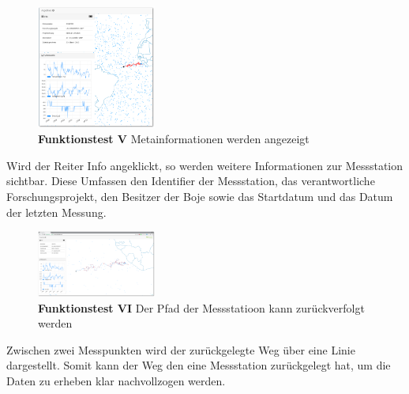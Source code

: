 \begin{figure}
 \centering
 \includegraphics[width=0.35\textwidth]{pix/ftest/003b.png}

 \caption{\textbf{Funktionstest V} Metainformationen werden angezeigt}
 \label{fig:ftest003b}
\end{figure}

Wird der Reiter Info angeklickt, so werden weitere Informationen zur Messstation sichtbar. Diese Umfassen den Identifier der Messstation, das verantwortliche Forschungsprojekt, den Besitzer der Boje sowie das Startdatum und das Datum der letzten Messung.
\newline\newline\newline\newline
\newline\newline\newline


\begin{figure}
 \centering
 \includegraphics[width=0.35\textwidth]{pix/ftest/004.png}

 \caption{\textbf{Funktionstest VI} Der Pfad der Messstatioon kann zurückverfolgt werden}
 \label{fig:ftest004}
\end{figure}

Zwischen zwei Messpunkten wird der zurückgelegte Weg über eine Linie dargestellt. Somit kann der Weg den eine Messstation zurückgelegt hat, um die Daten zu erheben klar nachvollzogen werden.
\newline\newline\newline\newline
\newline\newline\newline


